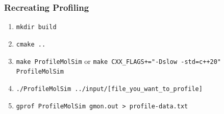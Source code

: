 \begin{frame}
	\PraesentationBildUhrenturm
\end{frame}

\begin{frame}
	\frametitle{Recreating Profiling}
	\large
	\begin{enumerate}
		\item \texttt{mkdir build}
		\item \texttt{cmake ..}
		\item \texttt{make ProfileMolSim} or \texttt{make CXX\_FLAGS+="-Dslow -std=c++20" ProfileMolSim}
		\item  \texttt{./ProfileMolSim ../input/[file\_you\_want\_to\_profile]}
		\item  \texttt{gprof ProfileMolSim gmon.out > profile-data.txt}
	\end{enumerate}
\end{frame}





